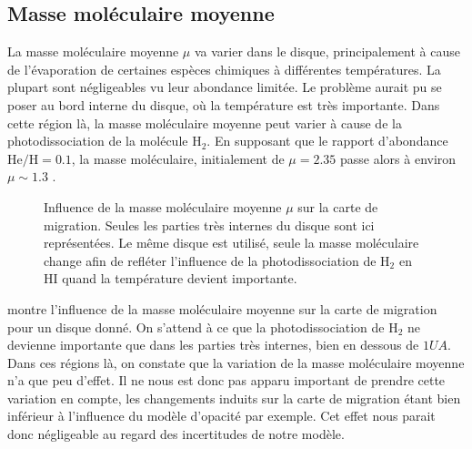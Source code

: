 \subsection{Masse moléculaire moyenne}
La masse moléculaire moyenne $\mu$ va varier dans le disque, principalement à cause de l'évaporation de certaines
espèces chimiques à différentes températures. La plupart sont négligeables vu leur abondance limitée. Le problème
aurait pu se poser au bord interne du disque, où la température est très importante. Dans cette région là, la masse moléculaire
moyenne peut varier à cause de la photodissociation de la molécule $\mathrm{H_2}$. En supposant que le rapport d'abondance
$\mathrm{He/H}=0.1$, la masse moléculaire, initialement de $\mu=2.35$ passe alors à environ $\mu\sim 1.3$ \citep[Annexe
A]{hure2000transition}.

\begin{figure}[htbp]
\centering
{}\hfill
{}
\caption{Influence de la masse moléculaire moyenne $\mu$ sur la carte de migration. Seules les
parties très internes du disque sont ici représentées. Le même disque est utilisé, seule la masse
moléculaire change afin de refléter l'influence de la photodissociation de $\mathrm{H_2}$ en
$\mathrm{HI}$ quand la température devient importante. }\label{fig:migration_map_mmw}
\end{figure}

 montre l'influence de la masse moléculaire moyenne sur la carte de migration pour un disque
donné. On s'attend à ce que la photodissociation de $\mathrm{H_2}$ ne devienne importante que dans les parties très internes,
bien en dessous de $1\unit{UA}$. Dans ces régions là, on constate que la variation de la masse moléculaire moyenne n'a que peu
d'effet. Il ne nous est donc pas apparu important de prendre cette variation en compte, les changements induits sur la carte de
migration étant bien inférieur à l'influence du modèle d'opacité par exemple. Cet effet nous parait donc négligeable au regard
des incertitudes de notre modèle.

